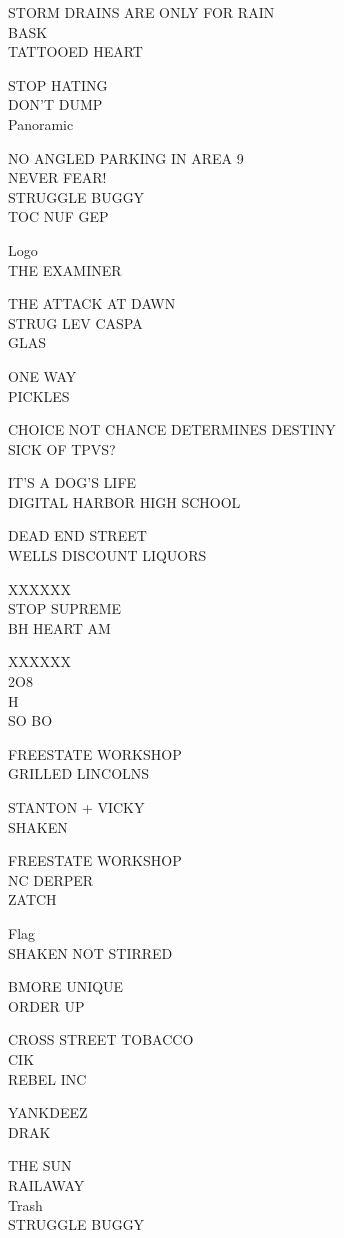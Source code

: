 \documentclass[10pt,letterpaper]{article}
\begin{document}
STORM DRAINS ARE ONLY FOR RAIN\\
BASK\\
TATTOOED HEART

STOP HATING\\
DON'T DUMP\\
Panoramic

NO ANGLED PARKING IN AREA 9\\
NEVER FEAR!\\
STRUGGLE BUGGY\\
TOC NUF GEP

Logo\\
THE EXAMINER

THE ATTACK AT DAWN\\
STRUG LEV CASPA\\
GLAS

ONE WAY\\
PICKLES

CHOICE NOT CHANCE DETERMINES DESTINY\\
SICK OF TPVS?

IT'S A DOG'S LIFE\\
DIGITAL HARBOR HIGH SCHOOL

DEAD END STREET\\
WELLS DISCOUNT LIQUORS

XXXXXX\\
STOP SUPREME\\
BH HEART AM

XXXXXX\\
2O8\\
H\\
SO BO

FREESTATE WORKSHOP\\
GRILLED LINCOLNS

STANTON + VICKY\\
SHAKEN

FREESTATE WORKSHOP\\
NC DERPER\\
ZATCH

Flag\\
SHAKEN NOT STIRRED

BMORE UNIQUE\\
ORDER UP

CROSS STREET TOBACCO\\
CIK\\
REBEL INC

YANKDEEZ\\
DRAK

THE SUN\\
RAILAWAY\\
Trash\\
STRUGGLE BUGGY
\end{document}

